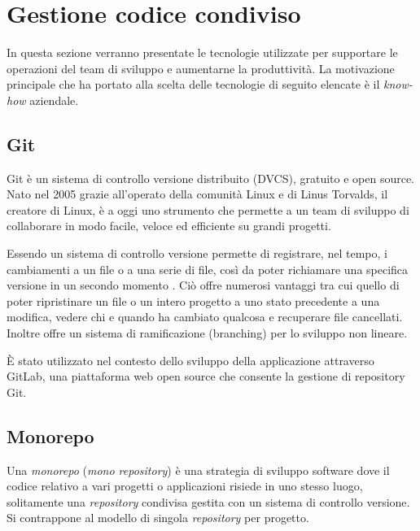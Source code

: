 \section{Gestione codice condiviso}
In questa sezione verranno presentate le tecnologie utilizzate per supportare le operazioni
del team di sviluppo e aumentarne la produttività.
La motivazione principale che ha portato alla scelta delle tecnologie di seguito elencate è il \textit{know-how} aziendale.

\subsection{Git}
Git \cite{Git} è un sistema di controllo versione distribuito (DVCS), gratuito e open source.
Nato nel 2005 grazie all'operato della comunità Linux e di Linus Torvalds, il creatore di Linux, è a oggi uno strumento che
permette a un team di sviluppo di collaborare in modo facile, veloce ed efficiente su grandi progetti.

Essendo un sistema di controllo versione permette di registrare, nel tempo, i cambiamenti a un file o a una serie di file,
così da poter richiamare una specifica versione in un secondo momento \cite{GitPro}.
Ciò offre numerosi vantaggi tra cui quello di poter ripristinare un file o un intero progetto a uno stato precedente a una modifica,
vedere chi e quando ha cambiato qualcosa e recuperare file cancellati.
Inoltre offre un sistema di ramificazione (branching) per lo sviluppo non lineare.

È stato utilizzato nel contesto dello sviluppo della applicazione attraverso GitLab, una piattaforma web open source che consente
la gestione di repository Git.

\subsection{Monorepo}
Una \textit{monorepo} \cite{Google-Monorepo} (\textit{mono repository}) è una strategia di sviluppo software dove il codice
relativo a vari progetti o applicazioni risiede in uno stesso luogo, solitamente una \textit{repository} condivisa
gestita con un sistema di controllo versione.
Si contrappone al modello di singola \textit{repository} per progetto.

